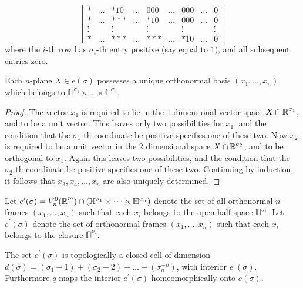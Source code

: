 \[\begin{bmatrix}
	* & \dots & *10 & \dots & 000 & \dots & 000 & \dots & 0 \\
	* & \dots & *** & \dots & *10 & \dots & 000 & \dots & 0 \\
	\vdots &  & \vdots &  & \vdots &  & \vdots &  & \vdots \\
	* & \dots & *** & \dots & *** & \dots & *10 & \dots & 0
\end{bmatrix}\]
where the $i$-th row has $\sigma_{i}$-th entry positive (say equal to $1$), and all subsequent entries zero.
\begin{lemma}\label{lem-6-2}
	Each $ n $-plane $X \in e(\sigma)$ possesses a unique orthonormal basis $(x_{1},\dots, x_{n})$ which belongs to $\mathbb{H}^{\sigma_{1}} \times\dots \times \mathbb{H}^{\sigma_{n}}$.
\end{lemma}
\begin{proof}
	The vector $x_{1}$ is required to lie in the $1$-dimensional vector space $X \cap \boldsymbol{\mathbb{R}}^{\sigma_{1}}$, and to be a unit vector. This leaves only two possibilities for $x_{1}$, and the condition that the $\sigma_{1}$-th coordinate be positive specifies one of these two. Now $x_{2}$ is required to be a unit vector in the $2$ dimensional space $X\cap\boldsymbol{\mathbb{R}}^{\sigma_{2}}$, and to be orthogonal to $x_{1} $. Again this leaves two possibilities, and the condition that the $\sigma_{2}$-th coordinate be positive specifies one of these two. Continuing by induction, it follows that $x_{3}, x_{4},\dots, x_{n}$ are also uniquely determined.
\end{proof}
\begin{definition}\label{def:6-2}
	Let $e^{\prime}(\sigma)=V_{n}^{0}(\boldsymbol{\mathbb{R}}^m) \cap(\mathbb{H}^{\sigma_{1}} \times\dots \times \mathbb{H}^{\sigma_{n}})$ denote the set of all orthonormal $n$-frames $(x_{1},\dots, x_{n})$ such that each $x_{i}$ belongs to the open half-space $\mathbb{H}^{\sigma_i}$. Let $\overline{e}^{\prime}(\sigma)$ denote the set of orthonormal frames $(x_{1},\dots, x_{n})$ such that each $x_{i}$ belongs to the closure $\overline{\mathbb{H}}^{\sigma_{i}}$.
\end{definition}
\begin{lemma}\label{lem-6-3}
	The set $\overline{e}^{\prime}(\sigma)$ is topologically a closed cell of dimension $d(\sigma)=(\sigma_{1}-1)+(\sigma_{2}-2)+\dots+(\sigma_{n}^{-n})$, with interior $e^{\prime}(\sigma) $. Furthermore $q$ maps the interior $e^{\prime}(\sigma)$ homeomorphically onto $e(\sigma)$.
\end{lemma}

